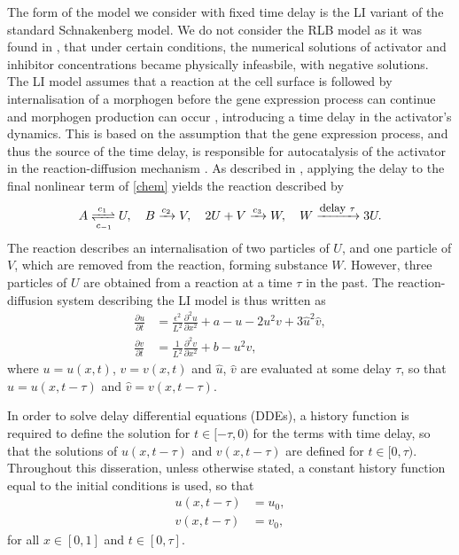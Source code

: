 The form of the model we consider with fixed time delay is the LI variant of the standard Schnakenberg model. We do not consider the RLB model as it was found in \cite{william}, that under certain conditions, the numerical solutions of activator and inhibitor concentrations became physically infeasbile, with negative solutions. The LI model assumes that a reaction at the cell surface is followed by internalisation of a morphogen before the gene expression process can continue and morphogen production can occur \cite{leegaffney,yigaffneyli}, introducing a time delay in the activator's dynamics.  This is based on the assumption that the gene expression process, and thus the source of the time delay, is responsible for autocatalysis of the activator in the reaction-diffusion mechanism \cite{gaffmonk}. As described in \cite{baker}, applying the delay to the final nonlinear term of \eqref{chem} yields the reaction described by
\begin{equation}\label{chem2}
A\xrightleftharpoons[c_{-1}]{c_1} U,\quad B\xrightarrow{c_2} V,\quad 2U+V\xrightarrow{c_3} W,\quad W\xrightarrow{\text{\footnotesize delay } \tau}3U.
\end{equation}
The reaction describes an internalisation of two particles of $U$, and one particle of $V$, which are removed from the reaction, forming substance $W$. However, three particles of $U$ are obtained from a reaction at a time $\tau$ in the past. The reaction-diffusion system describing the LI model is thus written as \cite{leegaffney}
\begin{equation}\label{fixed}
  \begin{split}
  \frac{\partial u}{\partial t}&=\frac{\epsilon^2}{L^2}\frac{\partial^2u}{\partial x^2}+a-u-2u^2v+3\hat{u}^2\hat{v},\\
  \frac{\partial v}{\partial t}&=\frac{1}{L^2}\frac{\partial^2v}{\partial x^2}+b-u^2v,
\end{split}
\end{equation}
where $u=u(x,t)$, $v=v(x,t)$ and $\hat{u}$, $\hat{v}$ are evaluated at some delay $\tau$, so that $\hat{u}=u(x,t-\tau)$ and $\hat{v}=v(x,t-\tau)$.

In order to solve delay differential equations (DDEs), a history function is required to define the solution for $t\in[-\tau,0)$ for the terms with time delay, so that the solutions of $u(x,t-\tau)$ and $v(x,t-\tau)$ are defined for $t\in[0,\tau)$. Throughout this disseration, unless otherwise stated, a constant history function equal to the initial conditions is used, so that
\begin{align*}
u(x,t-\tau)&=u_0,\\
v(x,t-\tau)&=v_0,
\end{align*}
for all $x\in[0, 1]$ and $t\in[0,\tau]$.

